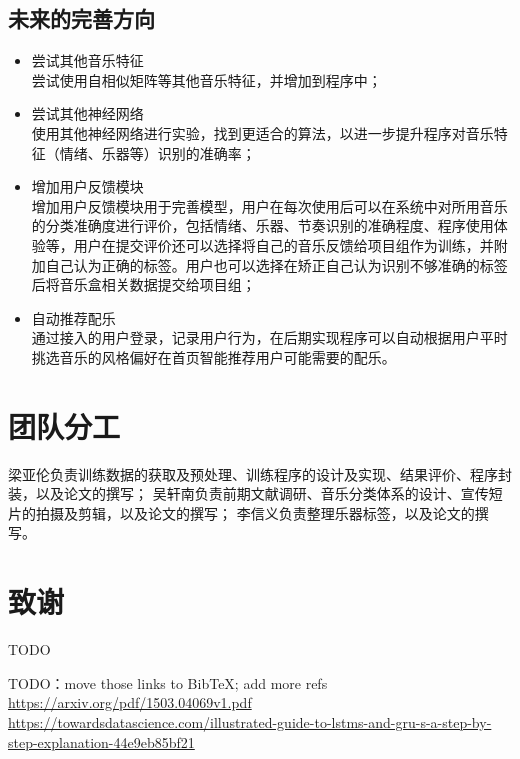 \documentclass[a4paper,utf8,10pt]{article}
\newcommand{\sept}{\setlength\itemsep{-4pt}}
\begin{document}
\subsection{未来的完善方向}
\begin{itemize}
  \sept
  \item 尝试其他音乐特征\\
  尝试使用自相似矩阵等其他音乐特征，并增加到程序中；
  \item 尝试其他神经网络\\
  使用其他神经网络进行实验，找到更适合的算法，以进一步提升程序对音乐特征（情绪、乐器等）识别的准确率；
  \item 增加用户反馈模块\\
  增加用户反馈模块用于完善模型，用户在每次使用后可以在系统中对所用音乐的分类准确度进行评价，包括情绪、乐器、节奏识别的准确程度、程序使用体验等，用户在提交评价还可以选择将自己的音乐反馈给项目组作为训练，并附加自己认为正确的标签。用户也可以选择在矫正自己认为识别不够准确的标签后将音乐盒相关数据提交给项目组；
  \item 自动推荐配乐\\
  通过接入的用户登录，记录用户行为，在后期实现程序可以自动根据用户平时挑选音乐的风格偏好在首页智能推荐用户可能需要的配乐。
\end{itemize}

\section{团队分工}

梁亚伦负责训练数据的获取及预处理、训练程序的设计及实现、结果评价、程序封装，以及论文的撰写；
吴轩南负责前期文献调研、音乐分类体系的设计、宣传短片的拍摄及剪辑，以及论文的撰写；
李信义负责整理乐器标签，以及论文的撰写。

\section{致谢}

TODO

{}


TODO：move those links to Bib\TeX ; add more refs\\
\url{https://arxiv.org/pdf/1503.04069v1.pdf}\\
\url{https://towardsdatascience.com/illustrated-guide-to-lstms-and-gru-s-a-step-by-step-explanation-44e9eb85bf21}
\end{document}
